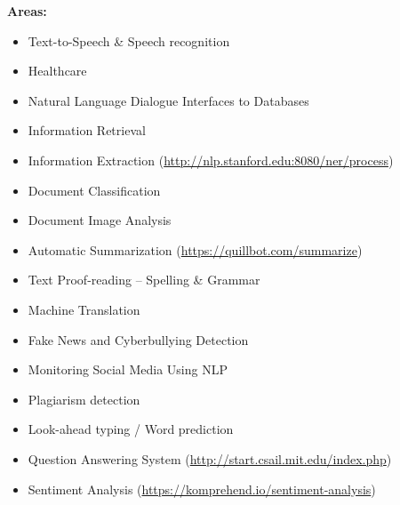\vspace{0.3cm}

\textbf{Areas:}
\begin{itemize}
    \item Text-to-Speech \& Speech recognition
    \item Healthcare
    \item Natural Language Dialogue Interfaces to Databases
    \item Information Retrieval
    \item Information Extraction (\href{http://nlp.stanford.edu:8080/ner/process}{http://nlp.stanford.edu:8080/ner/process}) 
    \item Document Classification
    \item Document Image Analysis
    \item Automatic Summarization (\href{https://quillbot.com/summarize}{https://quillbot.com/summarize}) 
    \item Text Proof-reading – Spelling \& Grammar
    \item Machine Translation
    \item Fake News and Cyberbullying Detection
    \item Monitoring Social Media Using NLP
    \item Plagiarism detection
    \item Look-ahead typing / Word prediction
    \item Question Answering System (\href{http://start.csail.mit.edu/index.php}{http://start.csail.mit.edu/index.php}) 
    \item Sentiment Analysis (\href{https://komprehend.io/sentiment-analysis}{https://komprehend.io/sentiment-analysis}) 
\end{itemize}






















































